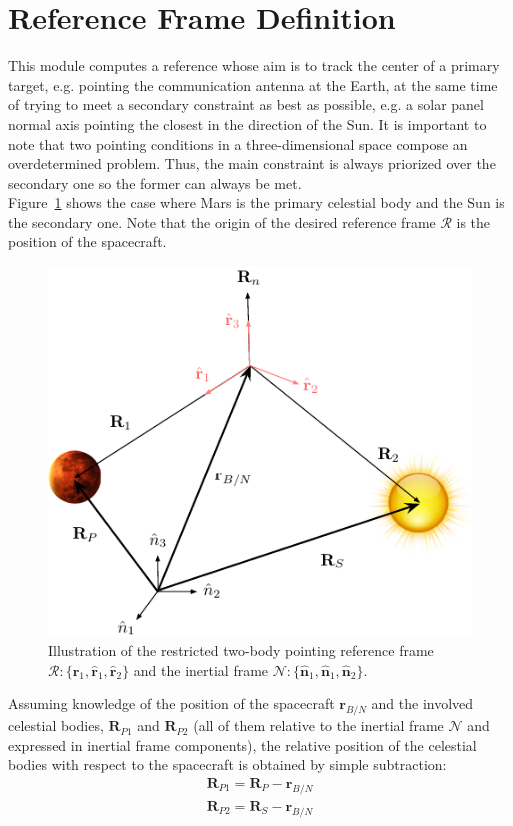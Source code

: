 \documentclass[]{AVSSimReportMemo}
\begin{document}
\section{Reference Frame Definition}
This module computes a reference whose aim is to track the center of a primary target, e.g. pointing the communication antenna at the Earth, at the same time of trying to meet a secondary constraint as best as possible, e.g. a solar panel normal axis pointing the closest in the direction of the Sun.  It is important to note that two pointing conditions in a three-dimensional space compose an overdetermined problem. Thus, the main constraint is always priorized over the secondary one so the former can always be met.\\
Figure~\ref{fig:fig1} shows the case where Mars is the primary celestial body and the Sun is the secondary one. Note that the origin of the desired reference frame $\mathcal{R}$ is the position of the spacecraft.
\begin{figure}[htb]
	\centerline{
	\includegraphics[]{Figures/fig1}
	}
	\caption{Illustration of the restricted two-body pointing reference frame $\mathcal{R}:\{ \hat{\bm r}_{1},\hat{\bm r}_{1}, \hat{\bm r}_{2} \}$ and the inertial frame $\mathcal{N}:\{ \hat{\bm n}_{1},\hat{\bm n}_{1}, \hat{\bm n}_{2} \}$.}
	\label{fig:fig1}
\end{figure}

Assuming knowledge of the position of the spacecraft $\bm{r}_{B/N}$ and the involved celestial bodies, $\bm{R}_{P1}$ and  $\bm{R}_{P2}$ (all of them relative to the inertial frame $\mathcal{N}$ and expressed in inertial frame components), the relative position of the celestial bodies with respect to the spacecraft is obtained by simple subtraction:
\begin{subequations}
	\begin{align}
		 \bm{R}_{P1} =\bm{R}_{P} - \bm{r}_{B/N} \\
		 \bm{R}_{P2} =\bm{R}_{S} - \bm{r}_{B/N}
	\end{align}
\end{subequations}
\end{document}
